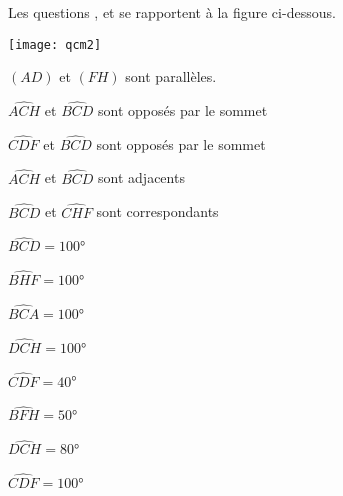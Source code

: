 \begin{QCM}

\begin{EnonceCommunQCM}
Les questions ,  et  se rapportent à la figure ci-dessous.
\begin{center}
    \texttt{[image: qcm2]}
    
    $(AD)$ et $(FH)$ sont parallèles.
\end{center}
\end{EnonceCommunQCM}

\begin{GroupeQCM}

\begin{exercice}\label{Aqcm3}

\begin{ChoixQCM}{2}
\item $\widehat{ACH}$ et $\widehat{BCD}$ sont opposés par le sommet
\item $\widehat{CDF}$ et $\widehat{BCD}$ sont opposés par le sommet
\item $\widehat{ACH}$ et $\widehat{BCD}$ sont adjacents
\item $\widehat{BCD}$ et $\widehat{CHF}$ sont correspondants
\end{ChoixQCM}
\begin{corrige}
\end{corrige}
\end{exercice}




\begin{exercice}\label{Aqcm4}

\begin{ChoixQCM}{4}
\item $\widehat{BCD}=100$°
\item $\widehat{BHF}=100$°
\item $\widehat{BCA}=100$°
\item $\widehat{DCH}=100$°
\end{ChoixQCM}
\begin{corrige}
\end{corrige}
\end{exercice}




\begin{exercice}\label{Aqcm5}

\begin{ChoixQCM}{4}
\item $\widehat{CDF}=40$°
\item $\widehat{BFH}=50$°
\item $\widehat{DCH}=80$°
\item $\widehat{CDF}=100$°
\end{ChoixQCM}
\begin{corrige}
\end{corrige}
\end{exercice}

\end{GroupeQCM}
\end{QCM}




